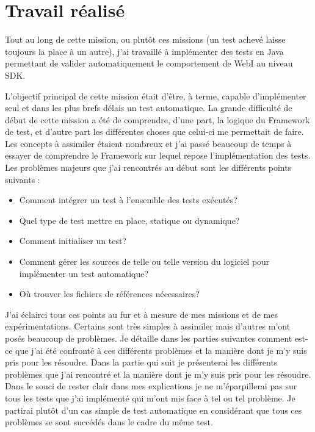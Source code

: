 \section{Travail r\'{e}alis\'{e}}

Tout au long de cette mission, ou plut\^{o}t ces missions (un test achev\'{e} laisse toujours la place \`{a} un autre), j'ai travaill\'{e} \`{a} impl\'{e}menter des tests en \gls{Java} permettant de valider automatiquement le comportement de WebI au niveau SDK.

L'objectif principal de cette mission \'{e}tait d'\^{e}tre, \`{a} terme, capable d'impl\'{e}menter seul et dans les plus brefs d\'{e}lais un test automatique. La grande difficult\'{e} de d\'{e}but de cette mission a \'{e}t\'{e} de comprendre, d'une part, la logique du \gls{Framework} de test, et d'autre part les diff\'{e}rentes choses que celui-ci me permettait de faire.\\

Les concepts \`{a} assimiler \'{e}taient nombreux et j'ai pass\'{e} beaucoup de temps \`{a} essayer de comprendre le \gls{Framework} sur lequel repose l'impl\'{e}mentation des tests. Les probl\`{e}mes majeurs que j'ai rencontr\'{e}s au d\'{e}but sont les diff\'{e}rents points suivants :
\begin{itemize}
	\item Comment int\'{e}grer un test \`{a} l'ensemble des tests ex\'{e}cut\'{e}s?
  \item Quel type de test mettre en place, statique ou dynamique?
	\item Comment initialiser un test?
	\item Comment g\'{e}rer les sources de telle ou telle version du logiciel pour impl\'{e}menter un test automatique?
	\item O\`{u} trouver les fichiers de r\'{e}f\'{e}rences n\'{e}cessaires?
\end{itemize}

J'ai \'{e}clairci tous ces points au fur et \`{a} mesure de mes missions et de mes exp\'{e}rimentations. Certains sont tr\`{e}s simples \`{a} assimiler mais d'autres m'ont pos\'{e}s beaucoup de probl\`{e}mes. Je d\'{e}taille dans les parties suivantes comment est-ce que j'ai \'{e}t\'{e} confront\'{e} \`{a} ces diff\'{e}rents probl\`{e}mes et la mani\`{e}re dont je m'y suis pris pour les r\'{e}soudre. Dans la partie qui suit je pr\'{e}senterai les diff\'{e}rents probl\`{e}mes que j'ai rencontr\'{e} et la mani\`{e}re dont je m'y suis pris pour les r\'{e}soudre. Dans le souci de rester clair dans mes explications je ne m'\'{e}parpillerai pas sur tous les tests que j'ai impl\'{e}ment\'{e} qui m'ont mis face \`{a} tel ou tel probl\`{e}me. Je partirai plut\^{o}t d'un cas simple de test automatique en consid\'{e}rant que tous ces probl\`{e}mes se sont succ\'{e}d\'{e}s dans le cadre du m\^{e}me test.\\


